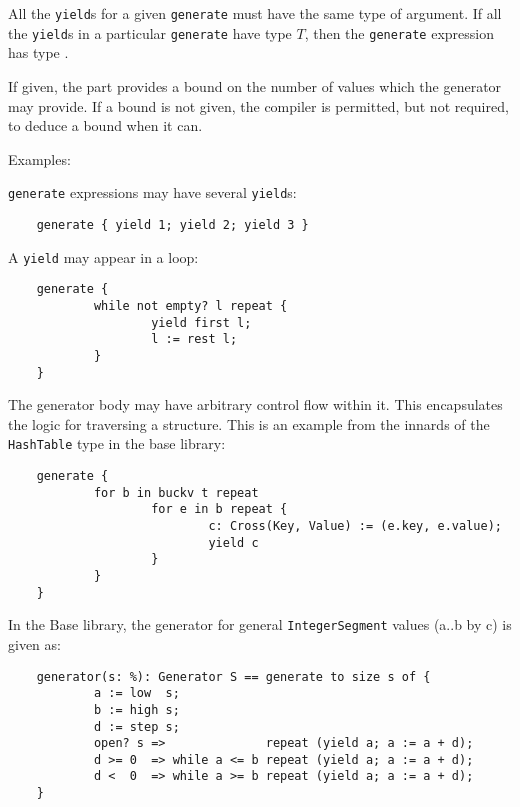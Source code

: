 All the \verb"yield"s
for a given \verb"generate" must have the same type of argument.
If all the \verb"yield"s in a particular \verb"generate" have type $T$,
then the \verb"generate" expression has type .

If given, the  part provides a bound on the number of values
which the generator may provide.  If a bound is not given, 
the compiler is permitted, but not required, to deduce a bound when it can.

Examples:

\verb"generate" expressions may have several \verb"yield"s:

\begin{small}
\begin{verbatim}
    generate { yield 1; yield 2; yield 3 }
\end{verbatim}
\end{small}

A \verb"yield" may appear in a loop:

\begin{small}
\begin{verbatim}
    generate {
            while not empty? l repeat {
                    yield first l;
                    l := rest l;
            }
    }
\end{verbatim}
\end{small}

The generator body may have arbitrary control flow within it.
This encapsulates the logic for traversing a structure.
This is an example from the innards of the \verb"HashTable" type in 
the base \asharp{} library:

\begin{small}
\begin{verbatim}
    generate {
            for b in buckv t repeat
                    for e in b repeat {
                            c: Cross(Key, Value) := (e.key, e.value);
                            yield c
                    }
            }
    }
\end{verbatim}
\end{small}

In the Base \asharp{} library, the generator for general \verb"IntegerSegment"
values (a..b by c) is given as:

\begin{small}
\begin{verbatim}
    generator(s: %): Generator S == generate to size s of {
            a := low  s;
            b := high s;
            d := step s;
            open? s =>              repeat (yield a; a := a + d);
            d >= 0  => while a <= b repeat (yield a; a := a + d);
            d <  0  => while a >= b repeat (yield a; a := a + d);
    }
\end{verbatim}
\end{small}

